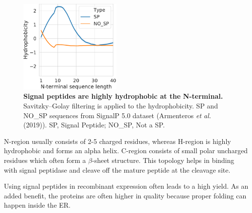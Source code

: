 \begin{figure}
  \begin{center}
    \includegraphics[width=0.45\textwidth]{chapters/Introduction/SignalPeptide/Figures/sp_nosp_lineplot.pdf}
    \caption[Signal peptides are highly hydrophobic at the N-terminal.]{\textbf{Signal peptides are highly hydrophobic at the N-terminal.} Savitzky–Golay filtering is applied to the hydrophobicity. SP and NO\_SP sequences from SignalP 5.0 dataset (Armenteros \textit{et al.} (2019)). SP, Signal Peptide; NO\_SP, Not a SP.}%
    \label{fig:signal_peptides}
  \end{center}
\end{figure}
N-region usually consists of 2-5 charged residues, whereas H-region is highly hydrophobic and forms an alpha helix. C-region consists of small polar uncharged residues which often form a $\beta$-sheet structure. This topology helps in binding with signal peptidase and cleave off the mature peptide at the cleavage site. 


Using signal peptides in recombinant expression often leads to a high yield. As an added benefit, the proteins are often higher in quality because proper folding can happen inside the ER. 

